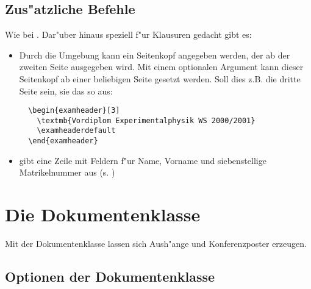 \documentclass[twoside,colorback,accentcolor=tud4c,11pt]{tudreport}
\begin{document}
  \section{Zus"atzliche Befehle}
    Wie bei . Dar"uber hinaus speziell f"ur Klausuren
    gedacht gibt es:
    \begin{itemize}\itemsep-0.5ex
     \item Durch die Umgebung  kann ein Seitenkopf angegeben werden, der ab
       der zweiten Seite ausgegeben wird. Mit einem optionalen Argument kann dieser 
       Seitenkopf ab einer beliebigen Seite gesetzt werden. Soll dies z.B. die dritte Seite sein,
       sie das so aus:
       \begin{verbatim}
  \begin{examheader}[3]
    \textmb{Vordiplom Experimentalphysik WS 2000/2001}
    \examheaderdefault
  \end{examheader}
       \end{verbatim}
     \item {} gibt eine Zeile mit Feldern f"ur Name,
     Vorname und siebenstellige Matrikelnummer aus (s. )
  \end{itemize}
    

\chapter{Die Dokumentenklasse \texorpdfstring{}{tudposter}}\label{chap:tudposter}
  
  Mit der Dokumentenklasse  lassen sich Aush"ange und
  Konferenzposter erzeugen.

  \section{Optionen der Dokumentenklasse \texorpdfstring{}{tudposter}}
        
\end{document}
